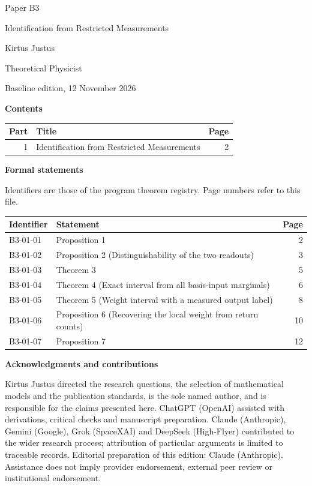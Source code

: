 \documentclass[11pt,a4paper]{article}
\begin{document}
\thispagestyle{empty}\pagestyle{empty}
{\small\sffamily \ProgramTitle\hfill Paper B3\par}
\vspace*{12mm}
{\LARGE\bfseries\raggedright{} Identification from Restricted Measurements\par}
\vspace{9mm}
{\large Kirtus Justus\par}\vspace{1mm}Theoretical Physicist\par\AuthorLocation\par\vspace{2mm}Baseline edition, 12 November 2026\par\vspace{8mm}
\textbf{Contents}\par\vspace{1mm}
{\small\begin{longtable}{@{}r>{\raggedright\arraybackslash}p{}r@{}}
\toprule Part & Title & Page\\\midrule\endhead
1 & Identification from Restricted Measurements & 2\\
\bottomrule\end{longtable}}
\vspace{2mm}\textbf{Formal statements}\par\vspace{1mm}
{\footnotesize Identifiers are those of the program theorem registry. Page numbers refer to this file.\par}
{\footnotesize\begin{longtable}{@{}l>{\raggedright\arraybackslash}p{}r@{}}
\toprule Identifier & Statement & Page\\\midrule\endhead
B3-01-01 & Proposition 1 & 2\\
B3-01-02 & Proposition 2 (Distinguishability of the two readouts) & 3\\
B3-01-03 & Theorem 3 & 5\\
B3-01-04 & Theorem 4 (Exact interval from all basis-input marginals) & 6\\
B3-01-05 & Theorem 5 (Weight interval with a measured output label) & 8\\
B3-01-06 & Proposition 6 (Recovering the local weight from return counts) & 10\\
B3-01-07 & Proposition 7 & 12\\
\bottomrule\end{longtable}}
\vspace{3mm}\textbf{Acknowledgments and contributions}\par
{\small Kirtus Justus directed the research questions, the selection of mathematical models and the publication standards, is the sole named author, and is responsible for the claims presented here. ChatGPT (OpenAI) assisted with derivations, critical checks and manuscript preparation. Claude (Anthropic), Gemini (Google), Grok (SpaceXAI) and DeepSeek (High-Flyer) contributed to the wider research process; attribution of particular arguments is limited to traceable records. Editorial preparation of this edition: Claude (Anthropic). Assistance does not imply provider endorsement, external peer review or institutional endorsement.\par}
\end{document}
